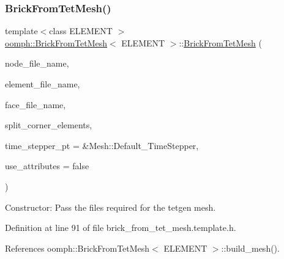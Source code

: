 \subsubsection{\texorpdfstring{Brick\+From\+Tet\+Mesh()}{BrickFromTetMesh()}\hspace{0.1cm}{\footnotesize\ttfamily [2/3]}}
{\footnotesize\ttfamily template$<$class E\+L\+E\+M\+E\+NT $>$ \\
\hyperlink{classoomph_1_1BrickFromTetMesh}{oomph\+::\+Brick\+From\+Tet\+Mesh}$<$ E\+L\+E\+M\+E\+NT $>$\+::\hyperlink{classoomph_1_1BrickFromTetMesh}{Brick\+From\+Tet\+Mesh} (\begin{DoxyParamCaption}\item[{const std\+::string \&}]{node\+\_\+file\+\_\+name,  }\item[{const std\+::string \&}]{element\+\_\+file\+\_\+name,  }\item[{const std\+::string \&}]{face\+\_\+file\+\_\+name,  }\item[{const bool \&}]{split\+\_\+corner\+\_\+elements,  }\item[{Time\+Stepper $\ast$}]{time\+\_\+stepper\+\_\+pt = {\ttfamily \&Mesh\+:\+:Default\+\_\+TimeStepper},  }\item[{const bool \&}]{use\+\_\+attributes = {\ttfamily false} }\end{DoxyParamCaption})\hspace{0.3cm}{\ttfamily [inline]}}



Constructor\+: Pass the files required for the tetgen mesh. 



Definition at line 91 of file brick\+\_\+from\+\_\+tet\+\_\+mesh.\+template.\+h.



References oomph\+::\+Brick\+From\+Tet\+Mesh$<$ E\+L\+E\+M\+E\+N\+T $>$\+::build\+\_\+mesh().

\mbox{\label{classoomph_1_1BrickFromTetMesh_a49d6a583221a04f2997dae4509592350}} 
